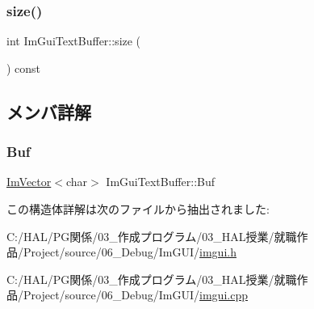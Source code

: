 \mbox{\label{struct_im_gui_text_buffer_a2811fcd43e0224eb3bd0f3464b634289}} 
\subsubsection{\texorpdfstring{size()}{size()}}
{\footnotesize\ttfamily int Im\+Gui\+Text\+Buffer\+::size (\begin{DoxyParamCaption}{ }\end{DoxyParamCaption}) const\hspace{0.3cm}{\ttfamily [inline]}}



\subsection{メンバ詳解}
\mbox{\label{struct_im_gui_text_buffer_aa6de034b1920cdae5505cc58abf14240}} 
\subsubsection{\texorpdfstring{Buf}{Buf}}
{\footnotesize\ttfamily \mbox{\hyperlink{class_im_vector}{Im\+Vector}}$<$char$>$ Im\+Gui\+Text\+Buffer\+::\+Buf}



この構造体詳解は次のファイルから抽出されました\+:\begin{DoxyCompactItemize}
\item 
C\+:/\+H\+A\+L/\+P\+G関係/03\+\_\+作成プログラム/03\+\_\+\+H\+A\+L授業/就職作品/\+Project/source/06\+\_\+\+Debug/\+Im\+G\+U\+I/\mbox{\hyperlink{imgui_8h}{imgui.\+h}}\item 
C\+:/\+H\+A\+L/\+P\+G関係/03\+\_\+作成プログラム/03\+\_\+\+H\+A\+L授業/就職作品/\+Project/source/06\+\_\+\+Debug/\+Im\+G\+U\+I/\mbox{\hyperlink{imgui_8cpp}{imgui.\+cpp}}\end{DoxyCompactItemize}
